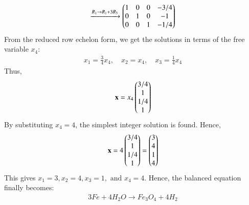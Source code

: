 \documentclass[journal]{IEEEtran}
\begin{document}
\begin{align*}
\xrightarrow{R_1 \to R_1 + 3R_3}
\begin{pmatrix}
1 & 0 & 0 & -3/4 \\
0 & 1 & 0 & -1 \\
0 & 0 & 1 & -1/4
\end{pmatrix}
\end{align*}
From the reduced row echelon form, we get the solutions in terms of the free variable $x_4$:
\begin{align}
    x_1 = \frac{3}{4}x_4, \quad x_2 = x_4, \quad x_3 = \frac{1}{4}x_4
\end{align}
Thus,
\begin{align}
    \mathbf{x} = x_4 \begin{pmatrix} 3/4 \\ 1 \\ 1/4 \\ 1 \end{pmatrix}
\end{align}
By substituting $x_4 = 4$, the simplest integer solution is found. Hence,
\begin{align}
    \mathbf{x} = 4 \begin{pmatrix} 3/4 \\ 1 \\ 1/4 \\ 1 \end{pmatrix} = \begin{pmatrix} 3 \\ 4 \\ 1 \\ 4 \end{pmatrix}
\end{align}
This gives $x_1 = 3, x_2 = 4, x_3 = 1, \text{ and } x_4 = 4$.
\bigskip
Hence, the balanced equation finally becomes:
\begin{align}
    \boxed{3Fe + 4H_2O \to Fe_3O_4 + 4H_2}
\end{align}
\end{document}
